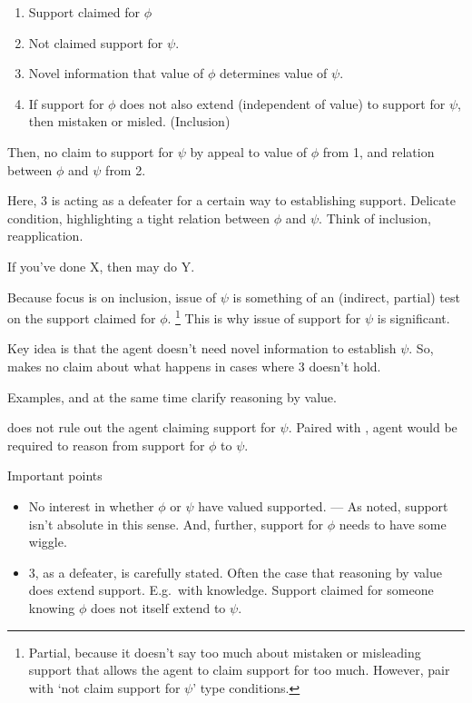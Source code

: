 \begin{note}[\nI{-}]
  \begin{proposition}
    \begin{enumerate}
    \item Support claimed for \(\phi\)
    \item Not claimed support for \(\psi\).
    \item Novel information that value of \(\phi\) determines value of \(\psi\).
    \item If support for \(\phi\) does not also extend (independent of value) to support for \(\psi\), then mistaken or misled. (Inclusion)
    \end{enumerate}
    Then, no claim to support for \(\psi\) by appeal to value of \(\phi\) from 1, and relation between \(\phi\) and \(\psi\) from 2.
  \end{proposition}
  Here, 3 is acting as a defeater for a certain way to establishing support.
  Delicate condition, highlighting a tight relation between \(\phi\) and \(\psi\).
  Think of inclusion, reapplication.

  If you've done X, then may do Y.

  Because focus is on inclusion, issue of \(\psi\) is something of an (indirect, partial) test on the support claimed for \(\phi\).\nolinebreak
  \footnote{
    Partial, because it doesn't say too much about mistaken or misleading support that allows the agent to claim support for too much.
    However, pair with `not claim support for \(\psi\)' type conditions.
  }
  This is why issue of support for \(\psi\) is significant.

  Key idea is that the agent doesn't need novel information to establish \(\psi\).
  So, \nI{} makes no claim about what happens in cases where 3 doesn't hold.

  Examples, and at the same time clarify reasoning by value.




  \nI{} does not rule out the agent claiming support for \(\psi\).
  Paired with \uRa{}, agent would be required to reason from support for \(\phi\) to \(\psi\).

  Important points
  \begin{itemize}
  \item No interest in whether \(\phi\) or \(\psi\) have valued supported. --- As noted, support isn't absolute in this sense. And, further, support for \(\phi\) needs to have some wiggle.
  \item 3, as a defeater, is carefully stated.
    Often the case that reasoning by value does extend support.
    E.g.\ with knowledge.
    Support claimed for someone knowing \(\phi\) does not itself extend to \(\psi\).
  \end{itemize}


\end{note}
